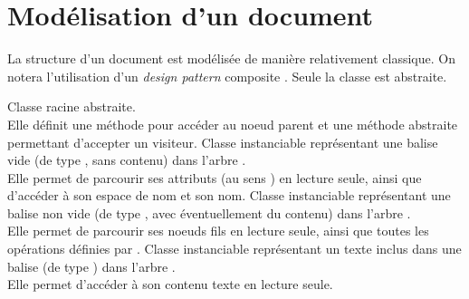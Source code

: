 \section{Modélisation d'un document \xml}
La structure d'un document \xml est modélisée de manière relativement classique. On notera l'utilisation d'un \emph{design pattern} \og composite \fg.
Seule la classe  est abstraite.
\begin{figure}[H]
\caption{}
\end{figure}
Classe racine abstraite. \\
Elle définit une méthode pour accéder au noeud parent et une méthode abstraite permettant d'accepter un visiteur.
Classe instanciable représentant une balise vide (de type , sans contenu) dans l'arbre \xml. \\
Elle permet de parcourir ses attributs (au sens \xml) en lecture seule, ainsi que d'accéder à son espace de nom et son nom.
Classe instanciable représentant une balise non vide (de type , avec éventuellement du contenu) dans l'arbre \xml. \\
Elle permet de parcourir ses noeuds fils en lecture seule, ainsi que toutes les opérations définies par .
Classe instanciable représentant un texte inclus dans une balise (de type ) dans l'arbre \xml. \\
Elle permet d'accéder à son contenu texte en lecture seule.
